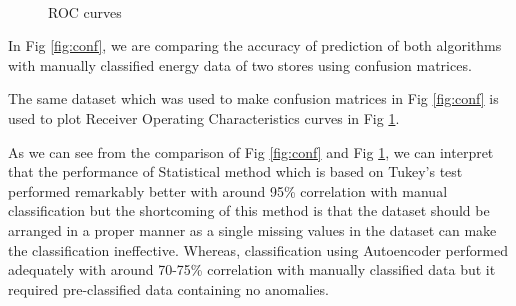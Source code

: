 \documentclass[conference]{IEEEtran}
\begin{document}
\begin{figure}[H]
	\centering
	\\
	\caption{ROC curves}
	\label{fig:ROC}
	
\end{figure}




In Fig \ref{fig:conf}, we are comparing the accuracy of prediction of both algorithms with manually classified energy data of two stores using confusion matrices. 


The same dataset which was used to make confusion matrices in Fig \ref{fig:conf} is used to plot Receiver Operating Characteristics curves in Fig \ref{fig:ROC}.




As we can see from the comparison of Fig \ref{fig:conf} and Fig \ref{fig:ROC}, we can interpret that the performance of Statistical method which is based on Tukey's test performed remarkably better with around 95\% correlation with manual classification but the shortcoming of this method is that the dataset should be arranged in a proper manner as a single missing values in the dataset can make the classification ineffective. Whereas, classification using Autoencoder performed adequately with around 70-75\% correlation with manually classified data but it required pre-classified data containing no anomalies.  
 
\end{document}
